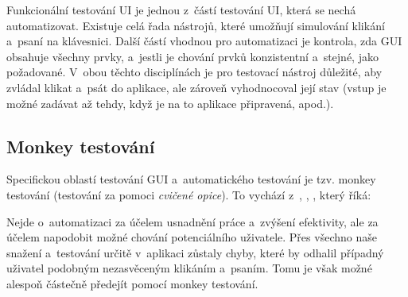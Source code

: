 		Funkcionální testování UI je jednou z~částí testování UI, která se nechá automatizovat. Existuje celá řada nástrojů, které umožňují simulování klikání a~psaní na klávesnici. Další částí vhodnou pro automatizaci je kontrola, zda GUI obsahuje všechny prvky, a~jestli je chování prvků konzistentní a~stejné, jako požadované. V~obou těchto disciplínách je pro testovací nástroj důležité, aby zvládal klikat a~psát do aplikace, ale zároveň vyhodnocoval její stav (vstup je možné zadávat až tehdy, když je na to aplikace připravená, apod.).
		
			\subsection{Monkey testování}\label{MonkeyTestovani}
			Specifickou oblastí testování GUI a~automatického testování je tzv. monkey testování (testování za pomoci \emph{cvičené opice}). To vychází z~, \citep{Patton}, \citep{Teorem}, který říká: 
			
			Nejde o~automatizaci za účelem usnadnění práce a~zvýšení efektivity, ale za účelem napodobit možné chování potenciálního uživatele. Přes všechno naše snažení a~testování určitě v~aplikaci zůstaly chyby, které by odhalil případný uživatel podobným nezasvěceným klikáním a~psaním. Tomu je však možné alespoň částečně předejít pomocí monkey testování.